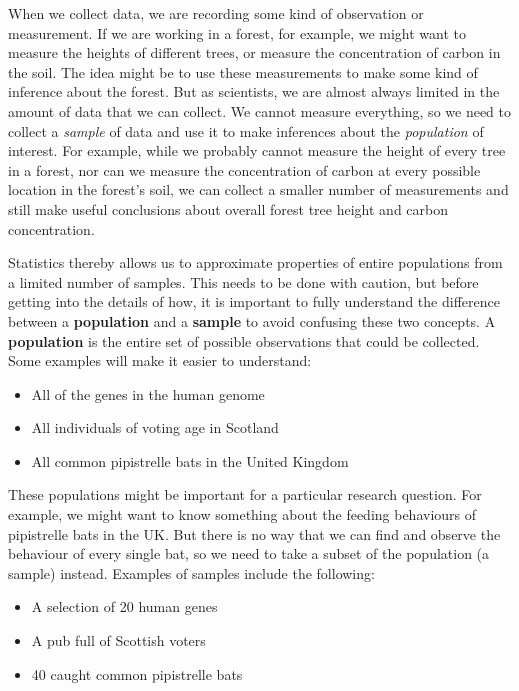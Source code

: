 \documentclass[
]{scrbook}
\providecommand{\tightlist}{%
  \setlength{\itemsep}{0pt}\setlength{\parskip}{0pt}}
\begin{document}
When we collect data, we are recording some kind of observation or measurement.
If we are working in a forest, for example, we might want to measure the heights of different trees, or measure the concentration of carbon in the soil.
The idea might be to use these measurements to make some kind of inference about the forest.
But as scientists, we are almost always limited in the amount of data that we can collect.
We cannot measure everything, so we need to collect a \emph{sample} of data and use it to make inferences about the \emph{population} of interest.
For example, while we probably cannot measure the height of every tree in a forest, nor can we measure the concentration of carbon at every possible location in the forest's soil, we can collect a smaller number of measurements and still make useful conclusions about overall forest tree height and carbon concentration.

Statistics thereby allows us to approximate properties of entire populations from a limited number of samples.
This needs to be done with caution, but before getting into the details of how, it is important to fully understand the difference between a \textbf{population} and a \textbf{sample} to avoid confusing these two concepts.
A \textbf{population} is the entire set of possible observations that could be collected.
Some examples will make it easier to understand:

\begin{itemize}
\tightlist
\item
  All of the genes in the human genome
\item
  All individuals of voting age in Scotland
\item
  All common pipistrelle bats in the United Kingdom
\end{itemize}

These populations might be important for a particular research question.
For example, we might want to know something about the feeding behaviours of pipistrelle bats in the UK.
But there is no way that we can find and observe the behaviour of every single bat, so we need to take a subset of the population (a sample) instead.
Examples of samples include the following:

\begin{itemize}
\tightlist
\item
  A selection of 20 human genes
\item
  A pub full of Scottish voters
\item
  40 caught common pipistrelle bats
\end{itemize}
\end{document}
